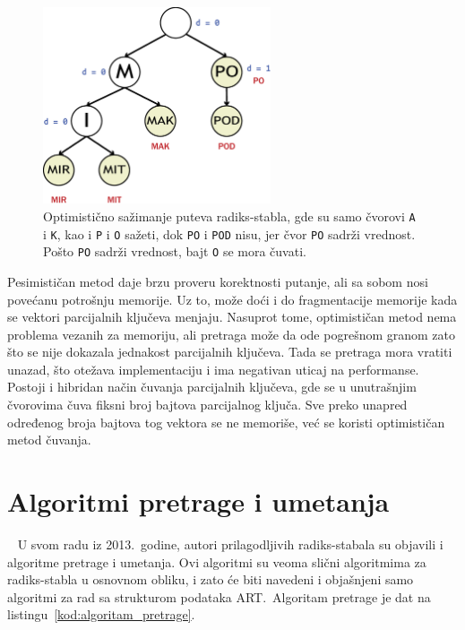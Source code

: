 \documentclass[12pt,oneside]{memoir}
\begin{document}
\begin{figure}[!h]
  \centering
  \includegraphics[width=0.60\textwidth]{radix_compression_optimistic.eps}
  \caption{Optimistično sažimanje puteva radiks-stabla, gde su samo
    čvorovi \texttt{A} i \texttt{K}, kao i \texttt{P} i \texttt{O} sažeti,
    dok \texttt{PO} i \texttt{POD} nisu, jer čvor \texttt{PO}
    sadrži vrednost. Pošto \texttt{PO} sadrži vrednost, bajt \texttt{O}
    se mora čuvati.}
  \label{fig:radix_compression_opt}
\end{figure}

Pesimističan metod daje brzu proveru korektnosti putanje, ali sa sobom nosi
povećanu potrošnju memorije. Uz to, može doći i do fragmentacije
memorije kada se vektori parcijalnih ključeva menjaju.
Nasuprot tome, optimističan metod nema
problema vezanih za memoriju, ali pretraga može da ode pogrešnom granom zato što se
nije dokazala jednakost parcijalnih ključeva. Tada se
pretraga mora vratiti unazad, što otežava implementaciju i ima negativan
uticaj na performanse. Postoji i hibridan način čuvanja parcijalnih ključeva,
gde se u unutrašnjim čvorovima čuva fiksni broj bajtova parcijalnog ključa.
Sve preko unapred određenog broja bajtova tog vektora se ne memoriše,
već se koristi optimističan metod čuvanja.

\section{Algoritmi pretrage i umetanja}~\label{sec:algoritmi_pretraga_umetanje}
U svom radu iz 2013.\ godine, autori prilagodljivih radiks-stabala su
objavili i algoritme pretrage i umetanja. Ovi algoritmi su veoma slični
algoritmima za radiks-stabla u osnovnom obliku, i zato će biti navedeni
i objašnjeni samo algoritmi za rad sa strukturom podataka ART.\
Algoritam pretrage je dat na listingu~\ref{kod:algoritam_pretrage}.
\end{document}
